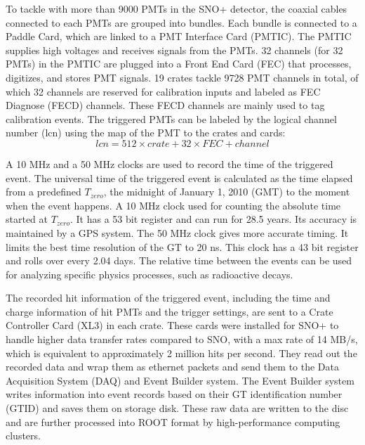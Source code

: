 To tackle with more than 9000 PMTs in the SNO+ detector, the coaxial cables connected to each PMTs are grouped into bundles. Each bundle is connected to a Paddle Card, which are linked to a PMT Interface Card (PMTIC). The PMTIC supplies high voltages and receives signals from the PMTs. 32 channels (for 32 PMTs) in the PMTIC are plugged into a Front End Card (FEC) that processes, digitizes, and stores PMT signals. 19 crates tackle 9728 PMT channels in total, of which 32 channels are reserved for calibration inputs and labeled as FEC Diagnose (FECD) channels. These FECD channels are mainly used to tag calibration events. The triggered PMTs can be labeled by the logical channel number (lcn) using the map of the PMT to the crates and cards\cite{snop_jinst,stringer2019sensitivity}:
\begin{equation}
lcn = 512 \times crate + 32 \times FEC + channel
\end{equation}

A 10 MHz and a 50 MHz clocks are used to record the time of the triggered event. The universal time of the triggered event is calculated as the time elapsed from a predefined $T_{zero}$, the midnight of January 1, 2010 (GMT) to the moment when the event happens. A 10 MHz clock used for counting the absolute time started at $T_{zero}$. It has a 53 bit register and can run for 28.5 years. Its accuracy is maintained by a GPS system. The 50 MHz clock gives more accurate timing. It limits the best time resolution of the GT to 20 ns. This clock has a 43 bit register and rolls over every 2.04 days. The relative time between the events can be used for analyzing specific physics processes, such as radioactive decays\cite{rattime,stringer2019sensitivity}. 

The recorded hit information of the triggered event, including the time and charge information of hit PMTs and the trigger settings, are sent to a Crate Controller Card (XL3) in each crate. These cards were installed for SNO+ to handle higher data transfer rates compared to SNO, with a max rate of 14 MB/s, which is equivalent to approximately 2 million hits per second\cite{bonventre2014neutron}. They read out the recorded data and wrap them as ethernet packets and send them to the Data Acquisition System (DAQ) and Event Builder system\cite{walker2016study}. The Event Builder system writes information into event records based on their GT identification number (GTID) and saves them on storage disk\cite{snop_jinst}. These raw data are written to the disc and are further processed into ROOT format by high-performance computing clusters.

